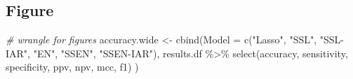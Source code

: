 \documentclass[
]{article}
\newenvironment{Shaded}{\begin{snugshade}}{\end{snugshade}}
\newcommand{\AttributeTok}[1]{\textcolor[rgb]{0.77,0.63,0.00}{#1}}
\newcommand{\CommentTok}[1]{\textcolor[rgb]{0.56,0.35,0.01}{\textit{#1}}}
\newcommand{\FunctionTok}[1]{\textcolor[rgb]{0.00,0.00,0.00}{#1}}
\newcommand{\NormalTok}[1]{#1}
\newcommand{\OtherTok}[1]{\textcolor[rgb]{0.56,0.35,0.01}{#1}}
\newcommand{\SpecialCharTok}[1]{\textcolor[rgb]{0.00,0.00,0.00}{#1}}
\newcommand{\StringTok}[1]{\textcolor[rgb]{0.31,0.60,0.02}{#1}}
\begin{document}
\hypertarget{figure}{%
\subsection{Figure}\label{figure}}

\begin{Shaded}
\begin{Highlighting}[]
\CommentTok{\# wrangle for figures}
\NormalTok{accuracy.wide }\OtherTok{\textless{}{-}} \FunctionTok{cbind}\NormalTok{(}\AttributeTok{Model =} \FunctionTok{c}\NormalTok{(}\StringTok{"Lasso"}\NormalTok{, }\StringTok{"SSL"}\NormalTok{, }\StringTok{"SSL{-}IAR"}\NormalTok{,}
                             \StringTok{"EN"}\NormalTok{, }\StringTok{"SSEN"}\NormalTok{, }\StringTok{"SSEN{-}IAR"}\NormalTok{),}
\NormalTok{                       results.df }\SpecialCharTok{\%\textgreater{}\%} \FunctionTok{select}\NormalTok{(accuracy, sensitivity, specificity,}
\NormalTok{                                             ppv, npv, mcc, f1)}
\NormalTok{)}


\end{Highlighting}
\end{Shaded}
\end{document}
